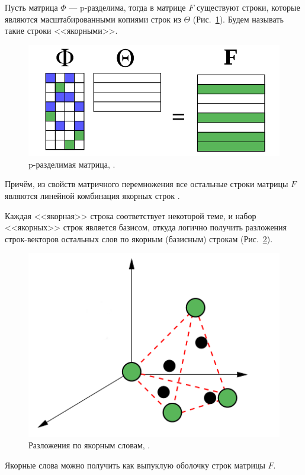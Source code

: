 \documentclass[a4paper, 14pt]{extarticle}
\begin{document}
Пусть матрица $\Phi$ --- p-разделима, тогда в матрице $F$ существуют строки, которые являются масштабированными копиями строк из $\Theta$ (Рис.~\ref{anch_1}). Будем называть такие строки <<якорными>>.
	\begin{figure}
			\centering \includegraphics[scale=0.5]{img/anch_1} 
			\caption{p-разделимая матрица, \cite{AnkurMoitraSlides}.}
			\label{anch_1}
	\end{figure}
Причём, из свойств матричного перемножения все остальные строки матрицы $F$ являются линейной комбинация якорных строк \cite{Arora12}.

Каждая <<якорная>> строка соответствует некоторой теме, и набор <<якорных>> строк является базисом, откуда логично получить разложения строк-векторов остальных слов по якорным (базисным) строкам (Рис.~\ref{anch_2}). 
	\begin{figure}[h]
		\centering \includegraphics[scale=0.6]{img/anch_2} 
		\caption{Разложения по якорным словам, \cite{AnkurMoitraSlides}.}
		\label{anch_2}
	\end{figure}
Якорные слова можно получить как выпуклую оболочку строк матрицы $F$. 
\end{document}
